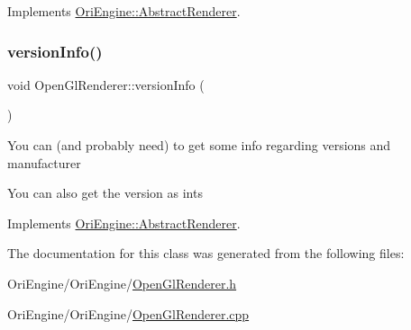 Implements \hyperlink{class_ori_engine_1_1_abstract_renderer_a2af2aba80028b0aa4cca39097e1fdf6d}{Ori\+Engine\+::\+Abstract\+Renderer}.

\hypertarget{class_ori_engine_1_1_open_gl_renderer_aaf6633305987ddf18d0a6e5e15e93352}{}\label{class_ori_engine_1_1_open_gl_renderer_aaf6633305987ddf18d0a6e5e15e93352} 
\subsubsection{\texorpdfstring{version\+Info()}{versionInfo()}}
{\footnotesize\ttfamily void Open\+Gl\+Renderer\+::version\+Info (\begin{DoxyParamCaption}{ }\end{DoxyParamCaption})\hspace{0.3cm}{\ttfamily [virtual]}}

You can (and probably need) to get some info regarding versions and manufacturer

You can also get the version as ints 

Implements \hyperlink{class_ori_engine_1_1_abstract_renderer_a978fc31cfc5fc8c2cafa3d33367fdb32}{Ori\+Engine\+::\+Abstract\+Renderer}.



The documentation for this class was generated from the following files\+:\begin{DoxyCompactItemize}
\item 
Ori\+Engine/\+Ori\+Engine/\hyperlink{_open_gl_renderer_8h}{Open\+Gl\+Renderer.\+h}\item 
Ori\+Engine/\+Ori\+Engine/\hyperlink{_open_gl_renderer_8cpp}{Open\+Gl\+Renderer.\+cpp}\end{DoxyCompactItemize}
